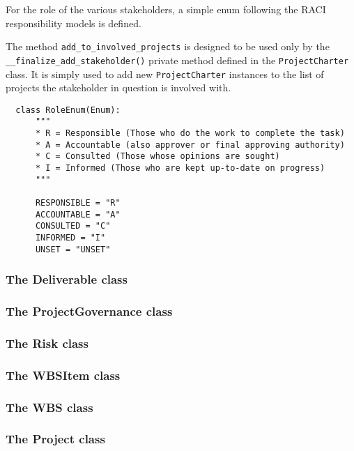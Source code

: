 For the role of the various stakeholders, a simple enum following the RACI responsibility models is defined.

The method \verb+add_to_involved_projects+ is designed to be used only by the \linebreak \verb+__finalize_add_stakeholder()+ private method defined in the \verb+ProjectCharter+ class. It is simply used to add new \verb+ProjectCharter+ instances to the list of projects the stakeholder in question is involved with.

\begin{lstlisting}
  class RoleEnum(Enum):
      """
      * R = Responsible (Those who do the work to complete the task)
      * A = Accountable (also approver or final approving authority)
      * C = Consulted (Those whose opinions are sought)
      * I = Informed (Those who are kept up-to-date on progress)
      """

      RESPONSIBLE = "R"
      ACCOUNTABLE = "A"
      CONSULTED = "C"
      INFORMED = "I"
      UNSET = "UNSET"
\end{lstlisting}


\subsubsection{The Deliverable class}


\subsubsection{The ProjectGovernance class}


\subsubsection{The Risk class}


\subsubsection{The WBSItem class}


\subsubsection{The WBS class}


\subsubsection{The Project class}
